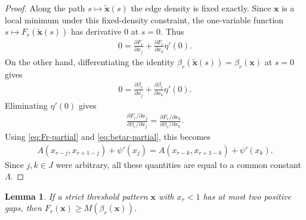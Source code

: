\documentclass[10pt,a4paper]{article}
\newtheorem{lemma}[definition]{Lemma}
\begin{document}
\begin{proof}
Along the path $s\mapsto\widetilde{\mathbf{x}}(s)$ the edge density is fixed exactly.
Since $\mathbf{x}$ is a local minimum under this fixed-density constraint, the
one-variable function $s\mapsto F_r(\widetilde{\mathbf{x}}(s))$ has derivative $0$ at
$s=0$.  Thus
\begin{align*}
  0=\frac{\partial F_r}{\partial x_j}
  +\frac{\partial F_r}{\partial x_k}\eta'(0).
\end{align*}        
On the other hand, differentiating the identity
$\beta_r(\widetilde{\mathbf{x}}(s))=\beta_r(\mathbf{x})$ at $s=0$ gives
\begin{align*}
  0=\frac{\partial \beta_r}{\partial x_j}
  +\frac{\partial \beta_r}{\partial x_k}\eta'(0).
\end{align*}
Eliminating $\eta'(0)$ gives
\begin{align*}
  \frac{\partial F_r/\partial x_j}{\partial \beta_r/\partial x_j}
  =
  \frac{\partial F_r/\partial x_k}{\partial \beta_r/\partial x_k}.
\end{align*}
Using \eqref{eq:Fr-partial} and \eqref{eq:betar-partial}, this becomes
\begin{align*}
  A(x_{r-j},x_{r+1-j})+\psi'(x_j)
  =A(x_{r-k},x_{r+1-k})+\psi'(x_k).
\end{align*}
Since $j,k\in J$ were arbitrary, all these quantities are equal to a common constant $\Lambda$.
\end{proof}

\begin{lemma}\label{lem:one-two-gaps}
If a strict threshold pattern $\mathbf{x}$ with $x_r<1$ has at most two positive gaps, then $F_r(\mathbf{x})\ge M(\beta_r(\mathbf{x}))$.
\end{lemma}
\end{document}
